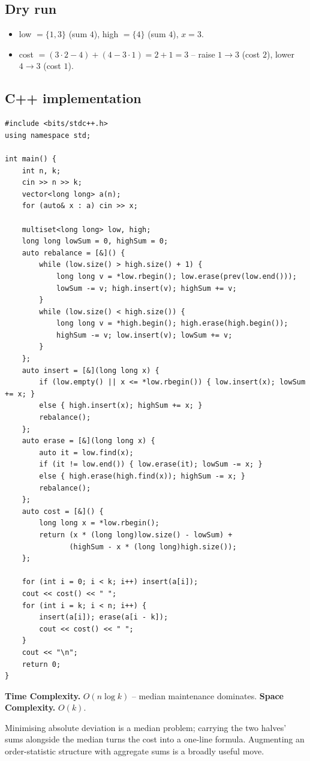 \subsection*{Dry run}


\begin{itemize}
  \item low $=\{1,3\}$ (sum $4$), high $=\{4\}$ (sum $4$), $x=3$.
  \item cost $=(3\cdot2-4)+(4-3\cdot1)=2+1=3$ -- raise $1\to3$ (cost $2$),
        lower $4\to3$ (cost $1$).
\end{itemize}

\subsection*{C++ implementation}

\begin{lstlisting}
#include <bits/stdc++.h>
using namespace std;

int main() {
    int n, k;
    cin >> n >> k;
    vector<long long> a(n);
    for (auto& x : a) cin >> x;

    multiset<long long> low, high;
    long long lowSum = 0, highSum = 0;
    auto rebalance = [&]() {
        while (low.size() > high.size() + 1) {
            long long v = *low.rbegin(); low.erase(prev(low.end()));
            lowSum -= v; high.insert(v); highSum += v;
        }
        while (low.size() < high.size()) {
            long long v = *high.begin(); high.erase(high.begin());
            highSum -= v; low.insert(v); lowSum += v;
        }
    };
    auto insert = [&](long long x) {
        if (low.empty() || x <= *low.rbegin()) { low.insert(x); lowSum += x; }
        else { high.insert(x); highSum += x; }
        rebalance();
    };
    auto erase = [&](long long x) {
        auto it = low.find(x);
        if (it != low.end()) { low.erase(it); lowSum -= x; }
        else { high.erase(high.find(x)); highSum -= x; }
        rebalance();
    };
    auto cost = [&]() {
        long long x = *low.rbegin();
        return (x * (long long)low.size() - lowSum) +
               (highSum - x * (long long)high.size());
    };

    for (int i = 0; i < k; i++) insert(a[i]);
    cout << cost() << " ";
    for (int i = k; i < n; i++) {
        insert(a[i]); erase(a[i - k]);
        cout << cost() << " ";
    }
    cout << "\n";
    return 0;
}
\end{lstlisting}

\begin{complexitybox}
\textbf{Time Complexity.} $O(n\log k)$ -- median maintenance dominates.
\textbf{Space Complexity.} $O(k)$.
\end{complexitybox}

\begin{takeawaybox}
Minimising absolute deviation is a median problem; carrying the two halves'
sums alongside the median turns the cost into a one-line formula. Augmenting
an order-statistic structure with aggregate sums is a broadly useful move.
\end{takeawaybox}
